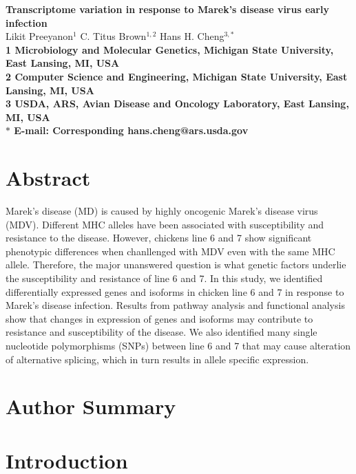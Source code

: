 \documentclass[10pt]{article}
\date{}
\begin{document}
\begin{flushleft}
{\Large
\textbf{Transcriptome variation in response to Marek's disease virus early infection}
}
\\
Likit Preeyanon$^{1}$
C. Titus Brown$^{1,2}$
Hans H. Cheng$^{3,\ast}$
\\
\bf{1} Microbiology and Molecular Genetics, Michigan State University, East Lansing, MI, USA
\\
\bf{2} Computer Science and Engineering, Michigan State University, East Lansing, MI, USA
\\
\bf{3} USDA, ARS, Avian Disease and Oncology Laboratory, East Lansing, MI, USA
\\
$\ast$ E-mail: Corresponding hans.cheng@ars.usda.gov
\end{flushleft}

\section*{Abstract}
Marek's disease (MD) is caused by highly oncogenic Marek's disease virus (MDV).
Different MHC alleles have been associated with susceptibility and resistance to the disease.
However, chickens line 6 and 7 show significant phenotypic differences when chanllenged with
MDV even with the same MHC allele. Therefore, the major unanswered question is what genetic factors
underlie the susceptibility and resistance of line 6 and 7.
In this study, we identified differentially expressed genes and isoforms in chicken line 6 and 7
in response to Marek's disease infection. Results from pathway analysis and functional analysis
show that changes in expression of genes and isoforms may contribute to resistance and
susceptibility of the disease. We also identified many single nucleotide polymorphisms (SNPs) between
line 6 and 7 that may cause alteration of alternative splicing, which in turn results in allele
specific expression.

\section*{Author Summary}

\section*{Introduction}
\end{document}

